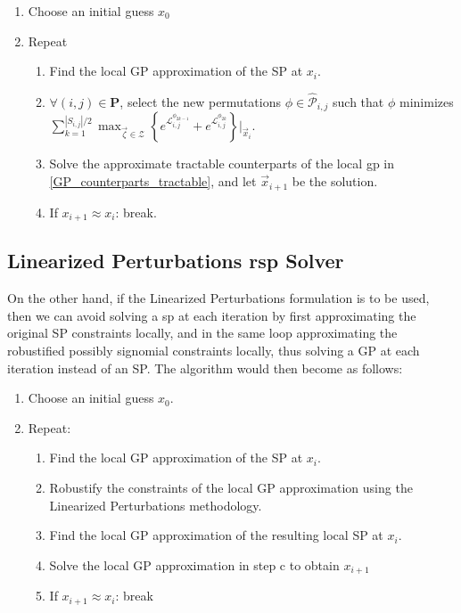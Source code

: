 \begin{enumerate}
    \item Choose an initial guess $x_0$
    \item Repeat
    \begin{enumerate}
        \item Find the local GP approximation of the SP at $x_i$.
        \item $\forall (i,j) \in \mathbf{P}$, select the new permutations $\phi \in \hat{\mathcal{P}}_{i,j}$
                such that $\phi$ minimizes $\textstyle{\sum}_{k=1}^{|S_{i,j}|/2}
        {\displaystyle \max_{\vec{\zeta} \in \mathcal{Z}}} \left\{e^{\mathcal{L}^{\phi_{2k-1}}_{i,j}} +
        e^{\mathcal{L}^{\phi_{2k}}_{i,j}}\right\}\bigg\rvert_{\vec{x}_i}$.
        \item Solve the approximate tractable counterparts of the local \gls{gp} in
                \eqref{GP_counterparts_tractable}, and let $\vec{x}_{i+1}$ be the solution.
        \item If $x_{i+1} \approx x_{i}$: break.
    \end{enumerate}
\end{enumerate}

\subsection{Linearized Perturbations \gls{rsp} Solver}

On the other hand, if the Linearized Perturbations formulation is to be used,
then we can avoid solving a \gls{sp} at each iteration by first
approximating the original SP constraints locally, and in the same loop approximating
the robustified possibly signomial constraints locally, thus solving a
GP at each iteration instead of an SP. The algorithm would then become as follows:

\begin{enumerate}
    \item Choose an initial guess $x_0$.
    \item Repeat:
    \begin{enumerate}
        \item Find the local GP approximation of the SP at $x_i$.
        \item Robustify the constraints of the local GP approximation using the Linearized Perturbations methodology.
        \item Find the local GP approximation of the resulting local SP at $x_i$.
        \item Solve the local GP approximation in step c to obtain $x_{i+1}$
        \item If $x_{i+1} \approx x_{i}$: break
    \end{enumerate}
\end{enumerate}
